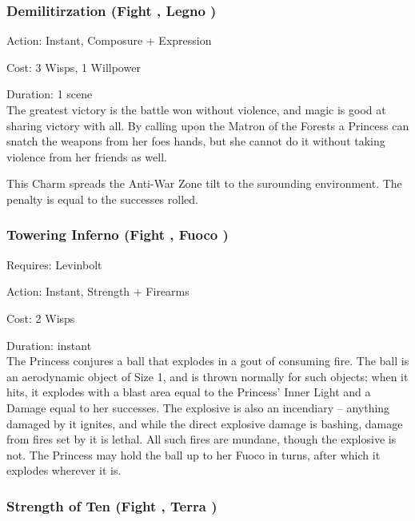 \subsubsection*{Demilitirzation (Fight \textbullet\textbullet\textbullet\textbullet, Legno \textbullet\textbullet\textbullet)}

\noindent Action: Instant, Composure + Expression

\noindent Cost: 3 Wisps, 1 Willpower

\noindent Duration: 1 scene\\

\noindent The greatest victory is the battle won without violence, and magic is good at sharing victory with all. By calling upon the Matron of the Forests a Princess can snatch the weapons from her foes hands, but she cannot do it without taking violence from her friends as well. 

This Charm spreads the Anti-War Zone tilt to the surounding environment. The penalty is equal to the successes rolled. 

\subsubsection*{Towering Inferno (Fight \textbullet\textbullet\textbullet\textbullet\textbullet, Fuoco \textbullet\textbullet\textbullet\textbullet)}

\noindent Requires: Levinbolt

\noindent Action: Instant, Strength + Firearms

\noindent Cost: 2 Wisps

\noindent Duration: instant\\

\noindent The Princess conjures a ball that explodes in a gout of consuming fire. The ball is an aerodynamic object of Size 1, and is thrown normally for such objects; when it hits, it explodes with a blast area equal to the Princess' Inner Light and a Damage equal to her successes. The explosive is also an incendiary -- anything damaged by it ignites, and while the direct explosive damage is bashing, damage from fires set by it is lethal. All such fires are mundane, though the explosive is not. The Princess may hold the ball up to her Fuoco in turns, after which it explodes wherever it is.

\subsubsection*{Strength of Ten (Fight \textbullet\textbullet\textbullet\textbullet\textbullet, Terra \textbullet\textbullet\textbullet)}

